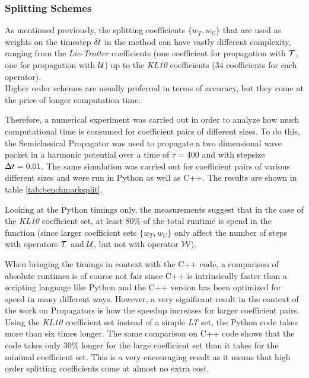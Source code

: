 \subsubsection{Splitting Schemes}
%
As mentioned previously, the splitting coefficients $\{ w_T, w_U \}$ that are used as weights on the timestep $\delta t$ in the  method can have vastly different complexity, ranging from the \emph{Lie-Trotter} coefficients (one coefficient for propagation with $\mathcal{T}$, one for propagation with $\mathcal{U}$) up to the \emph{KL10} coefficients (34 coefficients for each operator). \\
Higher order schemes are usually preferred in terms of accuracy, but they come at the price of longer computation time.
\par\medskip
%
Therefore, a numerical experiment was carried out in order to analyze how much computational time is consumed for coefficient pairs of different sizes.
To do this, the Semiclassical Propagator was used to propagate a two dimensional wave packet in a harmonic potential over a time of $\tau = 400$ and with stepsize $\Delta t = 0.01$.
The same simulation was carried out for coefficient pairs of various different sizes and were run in Python as well as C++.
The results are shown in table \ref{tab:benchmarksplit}. %
\par\medskip
%
Looking at the Python timings only, the measurements suggest that in the case of the \emph{KL10} coefficient set, at least 80\% of the total runtime is spend in the  function (since larger coefficient sets $\{ w_T, w_U \}$ only affect the number of steps with operators $\mathcal{T}$ and $\mathcal{U}$, but not with operator $\mathcal{W}$).
\par\medskip
%
When bringing the timings in context with the C++ code, a comparison of absolute runtimes is of course not fair since C++ is intrinsically faster than a scripting language like Python and the C++ version has been optimized for speed in many different ways.
However, a very significant result in the context of the work on Propagators is how the speedup increases for larger coefficient pairs.
Using the \emph{KL10} coefficient set instead of a simple \emph{LT} set, the Python code takes more than six times longer.
The same comparison on C++ code shows that the code takes only 30\% longer for the large coefficient set than it takes for the minimal coefficient set.
This is a very encouraging result as it means that high order splitting coefficients come at almost no extra cost.
\par\medskip
